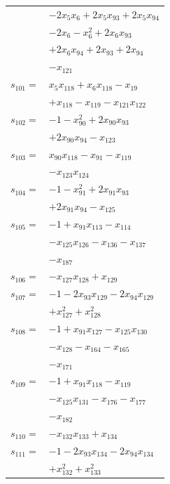 \begin{longtable}{@{}r@{\;}l@{}}
 & \(\displaystyle -2x_{5}x_{6} +2x_{5}x_{93} +2x_{5}x_{94}\) \\
 & \(\displaystyle -2x_{6} -x_{6}^{2} +2x_{6}x_{93}\) \\
 & \(\displaystyle +2x_{6}x_{94} +2x_{93} +2x_{94}\) \\
 & \(\displaystyle -x_{121}\) \\[3pt]
\(s_{101}=\) & \(\displaystyle x_{5}x_{118} +x_{6}x_{118} -x_{19}\) \\
 & \(\displaystyle +x_{118} -x_{119} -x_{121}x_{122}\) \\[3pt]
\(s_{102}=\) & \(\displaystyle -1 -x_{90}^{2} +2x_{90}x_{93}\) \\
 & \(\displaystyle +2x_{90}x_{94} -x_{123}\) \\[3pt]
\(s_{103}=\) & \(\displaystyle x_{90}x_{118} -x_{91} -x_{119}\) \\
 & \(\displaystyle -x_{123}x_{124}\) \\[3pt]
\(s_{104}=\) & \(\displaystyle -1 -x_{91}^{2} +2x_{91}x_{93}\) \\
 & \(\displaystyle +2x_{91}x_{94} -x_{125}\) \\[3pt]
\(s_{105}=\) & \(\displaystyle -1 +x_{91}x_{113} -x_{114}\) \\
 & \(\displaystyle -x_{125}x_{126} -x_{136} -x_{137}\) \\
 & \(\displaystyle -x_{187}\) \\[3pt]
\(s_{106}=\) & \(\displaystyle -x_{127}x_{128} +x_{129}\) \\[3pt]
\(s_{107}=\) & \(\displaystyle -1 -2x_{93}x_{129} -2x_{94}x_{129}\) \\
 & \(\displaystyle +x_{127}^{2} +x_{128}^{2}\) \\[3pt]
\(s_{108}=\) & \(\displaystyle -1 +x_{91}x_{127} -x_{125}x_{130}\) \\
 & \(\displaystyle -x_{128} -x_{164} -x_{165}\) \\
 & \(\displaystyle -x_{171}\) \\[3pt]
\(s_{109}=\) & \(\displaystyle -1 +x_{91}x_{118} -x_{119}\) \\
 & \(\displaystyle -x_{125}x_{131} -x_{176} -x_{177}\) \\
 & \(\displaystyle -x_{182}\) \\[3pt]
\(s_{110}=\) & \(\displaystyle -x_{132}x_{133} +x_{134}\) \\[3pt]
\(s_{111}=\) & \(\displaystyle -1 -2x_{93}x_{134} -2x_{94}x_{134}\) \\
 & \(\displaystyle +x_{132}^{2} +x_{133}^{2}\) \\[3pt]

\end{longtable}
